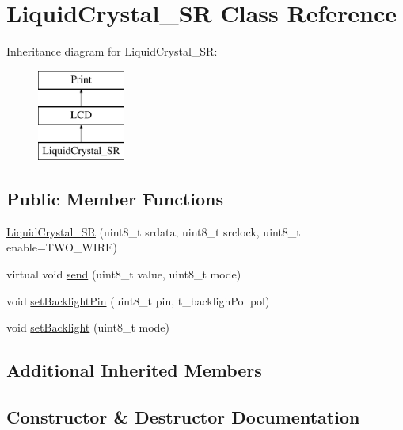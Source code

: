 \hypertarget{class_liquid_crystal___s_r}{}\section{Liquid\+Crystal\+\_\+\+S\+R Class Reference}
\label{class_liquid_crystal___s_r}
Inheritance diagram for Liquid\+Crystal\+\_\+\+S\+R\+:\begin{figure}[H]
\begin{center}
\leavevmode
\includegraphics[height=3.000000cm]{class_liquid_crystal___s_r}
\end{center}
\end{figure}
\subsection*{Public Member Functions}
\begin{DoxyCompactItemize}
\item 
\hyperlink{class_liquid_crystal___s_r_ac3fe0b48f8d4c1c941d82d1333495cfc}{Liquid\+Crystal\+\_\+\+S\+R} (uint8\+\_\+t srdata, uint8\+\_\+t srclock, uint8\+\_\+t enable=T\+W\+O\+\_\+\+W\+I\+R\+E)
\item 
virtual void \hyperlink{class_liquid_crystal___s_r_a03821351a32db07cb7e42c8c11ce8d47}{send} (uint8\+\_\+t value, uint8\+\_\+t mode)
\item 
void \hyperlink{class_liquid_crystal___s_r_a5bfc0dcc1f042bcb59992493a3a7231d}{set\+Backlight\+Pin} (uint8\+\_\+t pin, t\+\_\+backligh\+Pol pol)
\item 
void \hyperlink{class_liquid_crystal___s_r_ad9f3e3f36257984c23fb508973e14535}{set\+Backlight} (uint8\+\_\+t mode)
\end{DoxyCompactItemize}
\subsection*{Additional Inherited Members}


\subsection{Constructor \& Destructor Documentation}
\hypertarget{class_liquid_crystal___s_r_ac3fe0b48f8d4c1c941d82d1333495cfc}{}
